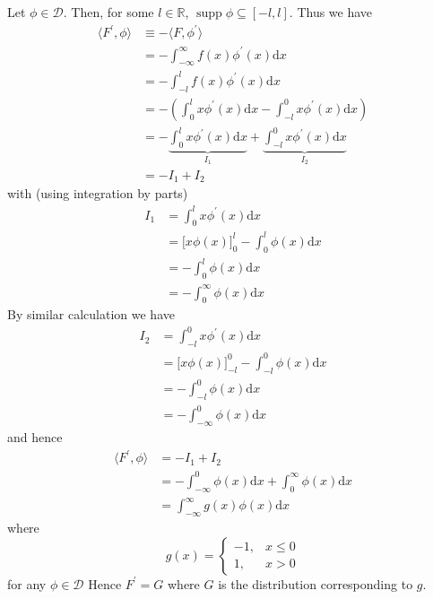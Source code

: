\documentclass{article}
\DeclareMathOperator\supp{supp}
\begin{document}
Let $\phi \in \mathcal{D}$. Then, for some $l \in \mathbb{R}$, $\supp
\phi \subseteq [-l, l]$. Thus we have
%
\begin{align*}
    \langle F^\prime, \phi \rangle
        &\equiv - \langle F, \phi^\prime \rangle \\
        &= - \int_{- \infty}^{\infty} f(x) \phi^\prime(x) \mathrm{d} x \\
        &= - \int_{-l}^{l} f(x) \phi^\prime(x) \mathrm{d} x \\
        &= - \left(
                {\int_{0}^{l} x \phi^\prime(x) \mathrm{d} x}
                - {\int_{-l}^{0} x \phi^\prime(x) \mathrm{d} x}
             \right) \\
        &= - \underbrace{\int_{0}^{l} x \phi^\prime(x) \mathrm{d} x}_{I_1}
            + \underbrace{\int_{-l}^{0} x \phi^\prime(x) \mathrm{d} x}_{I_2} \\
        &= - I_1 + I_2
\end{align*}
%
with (using integration by parts)
%
\begin{align*}
    I_1 &= \int_{0}^{l} x \phi^\prime(x) \mathrm{d} x \\
        &= \big[ x \phi(x) \big]_{0}^{l} - \int_{0}^{l} \phi(x) \mathrm{d} x \\
        &= - \int_{0}^{l} \phi(x) \mathrm{d} x \\
        &= - \int_{0}^{\infty} \phi(x) \mathrm{d} x
\end{align*}
%
By similar calculation we have
%
\begin{align*}
    I_2 &= \int_{-l}^{0} x \phi^\prime(x) \mathrm{d} x \\
        &= \big[ x \phi(x) \big]_{-l}^{0} - \int_{-l}^{0} \phi(x) \mathrm{d} x \\
        &= - \int_{-l}^{0} \phi(x) \mathrm{d} x \\
        &= - \int_{-\infty}^{0} \phi(x) \mathrm{d} x
\end{align*}
%
and hence
%
\begin{align*}
    \langle F^\prime, \phi \rangle
        &= - I_1 + I_2 \\
        &= - \int_{- \infty}^{0} \phi(x) \mathrm{d} x + \int_{0}^{\infty} \phi(x) \mathrm{d} x \\
        &= \int_{- \infty}^{\infty} g(x) \phi(x) \mathrm{d} x
\end{align*}
%
where
%
\begin{equation*}
    g(x) =
        \begin{cases}
            -1, & x \leq 0 \\
            1, & x > 0
        \end{cases}
\end{equation*}
%
for any $\phi \in \mathcal{D}$ Hence $F^\prime = G$ where $G$ is the
distribution corresponding to $g$.
\end{document}
